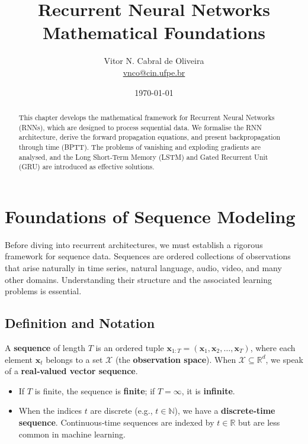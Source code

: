 \documentclass{tufte-handout}
\title{Recurrent Neural Networks \\ Mathematical Foundations}
\author{Vitor N. Cabral de Oliveira\\ \href{mailto:vnco@cin.ufpe.br}{vnco@cin.ufpe.br}}
\date{\today}
\begin{document}
\maketitle

\begin{abstract}
    This chapter develops the mathematical framework for Recurrent Neural Networks (RNNs), which are designed to process sequential data. We formalise the RNN architecture, derive the forward propagation equations, and present backpropagation through time (BPTT). The problems of vanishing and exploding gradients are analysed, and the Long Short‑Term Memory (LSTM) and Gated Recurrent Unit (GRU) are introduced as effective solutions.
\end{abstract}

\newpage
\hypersetup{linkcolor=wp-text}
\tableofcontents
\hypersetup{linkcolor=wp-primary}
\newpage

\section{Foundations of Sequence Modeling}

Before diving into recurrent architectures, we must establish a rigorous framework for sequence data. Sequences are ordered collections of observations that arise naturally in time series, natural language, audio, video, and many other domains. Understanding their structure and the associated learning problems is essential.

\subsection{Definition and Notation}

\begin{defn}[Sequence]
    A \textbf{sequence} of length $T$ is an ordered tuple $\mathbf{x}_{1:T} = (\mathbf{x}_1, \mathbf{x}_2, \dots, \mathbf{x}_T)$, where each element $\mathbf{x}_t$ belongs to a set $\mathcal{X}$ (the \textbf{observation space}). When $\mathcal{X} \subseteq \mathbb{R}^d$, we speak of a \textbf{real‑valued vector sequence}. 
    \begin{itemize}
        \item If $T$ is finite, the sequence is \textbf{finite}; if $T = \infty$, it is \textbf{infinite}.
        \item When the indices $t$ are discrete (e.g., $t \in \mathbb{N}$), we have a \textbf{discrete‑time sequence}. Continuous‑time sequences are indexed by $t \in \mathbb{R}$ but are less common in machine learning.
    \end{itemize}
\end{defn}
\end{document}
